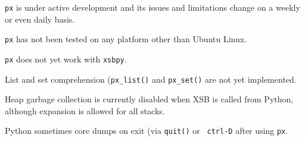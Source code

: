{\tt px} is under active development and its issues and limitations
change on a weekly or even daily basis.

\bi

\item {\tt px} has not been tested on any platform other than Ubuntu
  Linux.
\item {\tt px} does not yet work with {\tt xsbpy}.
\item List and set comprehension ({\tt px\_list()} and {\tt px\_set()}
  are not yet implemented.
\item Heap garbage collection is currently disabled when XSB is called
  from Python, although expansion is allowed for all stacks. 
\item Python sometimes core dumps on exit (via {\tt quit()} or {\tt
  ctrl-D} after using {\tt px}.
  
\ei  
